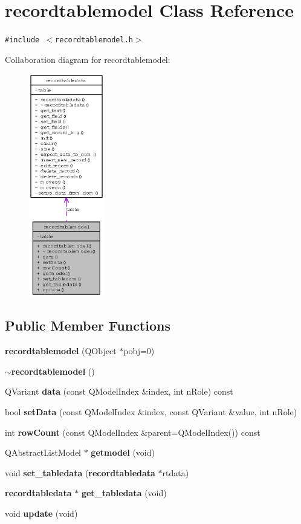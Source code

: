 \section{recordtablemodel Class Reference}
\label{classrecordtablemodel}
{\tt \#include $<$recordtablemodel.h$>$}

Collaboration diagram for recordtablemodel:\begin{figure}[H]
\begin{center}
\leavevmode
\includegraphics[width=93pt]{classrecordtablemodel__coll__graph}
\end{center}
\end{figure}
\subsection*{Public Member Functions}
\begin{CompactItemize}
\item 
{\bf recordtablemodel} (QObject $\ast$pobj=0)
\item 
{\bf $\sim$recordtablemodel} ()
\item 
QVariant {\bf data} (const QModel\-Index \&index, int n\-Role) const
\item 
bool {\bf set\-Data} (const QModel\-Index \&index, const QVariant \&value, int n\-Role)
\item 
int {\bf row\-Count} (const QModel\-Index \&parent=QModel\-Index()) const
\item 
QAbstract\-List\-Model $\ast$ {\bf getmodel} (void)
\item 
void {\bf set\_\-tabledata} ({\bf recordtabledata} $\ast$rtdata)
\item 
{\bf recordtabledata} $\ast$ {\bf get\_\-tabledata} (void)
\item 
void {\bf update} (void)
\end{CompactItemize}
